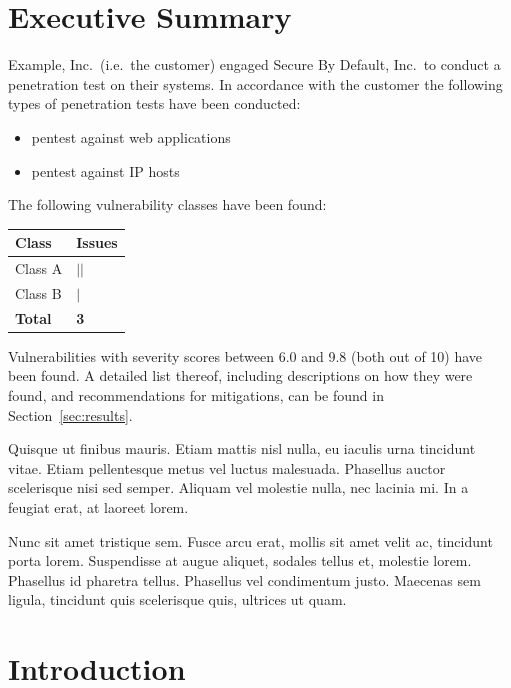 \documentclass[a4paper]{article}
\begin{document}
\clearpage
\section*{Executive Summary}

Example, Inc.\ (i.e.\ the customer) engaged Secure By Default, Inc.\ to conduct a penetration test on their systems.
In accordance with the customer the following types of penetration tests have been conducted:

\begin{itemize}
      \item pentest against web applications
      \item pentest against IP hosts
  \end{itemize}

The following vulnerability classes have been found:

\begin{table}[h!]
  \centering
  \begin{tabular}{ll}
    \textbf{Class} & \textbf{Issues} \\
    \hline
          Class A & \(|\)\(|\) \\
          Class B & \(|\) \\
        \hline
    \textbf{Total} & \textbf{3}
  \end{tabular}
\end{table}

Vulnerabilities with severity scores between 6.0 and 9.8 (both out of 10) have been found.
A detailed list thereof, including descriptions on how they were found, and recommendations for mitigations, can be found in Section~\ref{sec:results}.

Quisque ut finibus mauris.
Etiam mattis nisl nulla, eu iaculis urna tincidunt vitae.
Etiam pellentesque metus vel luctus malesuada.
Phasellus auctor scelerisque nisi sed semper.
Aliquam vel molestie nulla, nec lacinia mi.
In a feugiat erat, at laoreet lorem.

Nunc sit amet tristique sem.
Fusce arcu erat, mollis sit amet velit ac, tincidunt porta lorem.
Suspendisse at augue aliquet, sodales tellus et, molestie lorem.
Phasellus id pharetra tellus.
Phasellus vel condimentum justo.
Maecenas sem ligula, tincidunt quis scelerisque quis, ultrices ut quam.


\clearpage
\tableofcontents

\clearpage
\section{Introduction}
\end{document}
